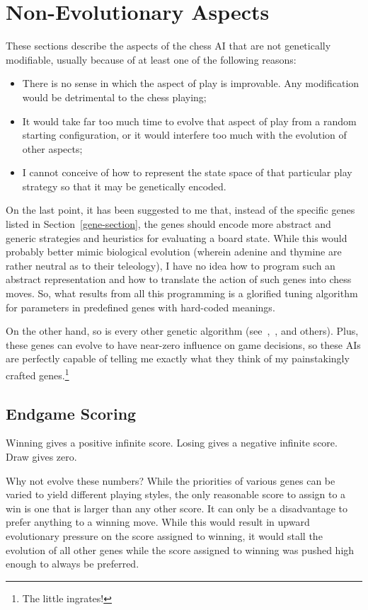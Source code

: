 \documentclass[letterpaper]{article}
\renewcommand{\_}{\allowbreak\textunderscore\allowbreak}
\begin{document}
\section{Non-Evolutionary Aspects}

These sections describe the aspects of the chess AI that are not genetically modifiable, usually because of at least one of the following reasons:
\begin{itemize}
	\item There is no sense in which the aspect of play is improvable. Any modification would be detrimental to the chess playing;
	\item It would take far too much time to evolve that aspect of play from a random starting configuration, or it would interfere too much with the evolution of other aspects;
	\item I cannot conceive of how to represent the state space of that particular play strategy so that it may be genetically encoded.
\end{itemize}
On the last point, it has been suggested to me that, instead of the specific genes listed in Section~\ref{gene-section}, the genes should encode more abstract and generic strategies and heuristics for evaluating a board state. While this would probably better mimic biological evolution (wherein adenine and thymine are rather neutral as to their teleology), I have no idea how to program such an abstract representation and how to translate the action of such genes into chess moves. So, what results from all this programming is a glorified tuning algorithm for parameters in predefined genes with hard-coded meanings.

On the other hand, so is every other genetic algorithm (see~\cite{evolved-antenna},~\cite{evolved-stellarator}, and others). Plus, these genes can evolve to have near-zero influence on game decisions, so these AIs are perfectly capable of telling me exactly what they think of my painstakingly crafted genes.\footnote{The little ingrates!}

\subsection{Endgame Scoring}

Winning gives a positive infinite score.
Losing gives a negative infinite score.
Draw gives zero.

Why not evolve these numbers? While the priorities of various genes can be varied to yield different playing styles, the only reasonable score to assign to a win is one that is larger than any other score. It can only be a disadvantage to prefer anything to a winning move. While this would result in upward evolutionary pressure on the score assigned to winning, it would stall the evolution of all other genes while the score assigned to winning was pushed high enough to always be preferred.
\end{document}
